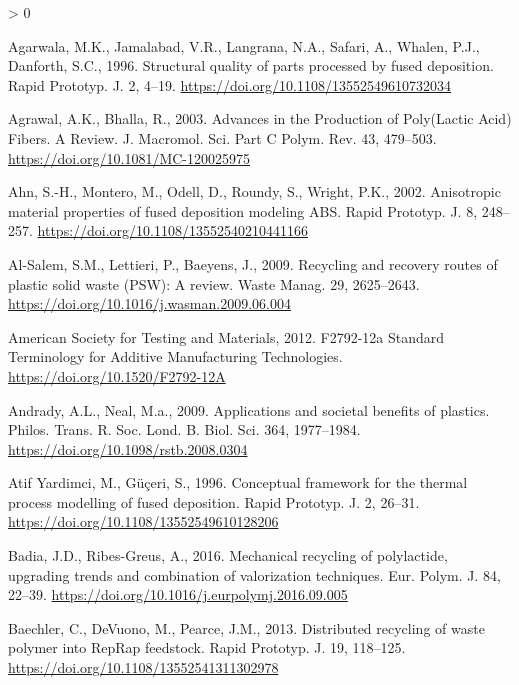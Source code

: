 \documentclass[
]{article}
\newlength{\cslhangindent}
\newenvironment{CSLReferences}[2] %
 {%
  \setlength{\parindent}{0pt}
  \ifodd #1 \everypar{\setlength{\hangindent}{\cslhangindent}}\ignorespaces\fi
  \ifnum #2 > 0
  \setlength{\parskip}{#2\baselineskip}
  \fi
 }%
 {}
\begin{document}
\hypertarget{refs}{}
\begin{CSLReferences}{1}{0}
\leavevmode\hypertarget{ref-Agarwala1996}{}%
Agarwala, M.K., Jamalabad, V.R., Langrana, N.A., Safari, A., Whalen,
P.J., Danforth, S.C., 1996. {Structural quality of parts processed by
fused deposition}. Rapid Prototyp. J. 2, 4--19.
\url{https://doi.org/10.1108/13552549610732034}

\leavevmode\hypertarget{ref-Agrawal2003}{}%
Agrawal, A.K., Bhalla, R., 2003. {Advances in the Production of
Poly(Lactic Acid) Fibers. A Review}. J. Macromol. Sci. Part C Polym.
Rev. 43, 479--503. \url{https://doi.org/10.1081/MC-120025975}

\leavevmode\hypertarget{ref-Ahn2002}{}%
Ahn, S.-H., Montero, M., Odell, D., Roundy, S., Wright, P.K., 2002.
{Anisotropic material properties of fused deposition modeling ABS}.
Rapid Prototyp. J. 8, 248--257.
\url{https://doi.org/10.1108/13552540210441166}

\leavevmode\hypertarget{ref-AlSalem2009}{}%
Al-Salem, S.M., Lettieri, P., Baeyens, J., 2009. {Recycling and recovery
routes of plastic solid waste (PSW): A review}. Waste Manag. 29,
2625--2643. \url{https://doi.org/10.1016/j.wasman.2009.06.004}

\leavevmode\hypertarget{ref-ASTM2012}{}%
American Society for Testing and Materials, 2012. {F2792-12a Standard
Terminology for Additive Manufacturing Technologies}.
\url{https://doi.org/10.1520/F2792-12A}

\leavevmode\hypertarget{ref-Andrady2009}{}%
Andrady, A.L., Neal, M.a., 2009. {Applications and societal benefits of
plastics.} Philos. Trans. R. Soc. Lond. B. Biol. Sci. 364, 1977--1984.
\url{https://doi.org/10.1098/rstb.2008.0304}

\leavevmode\hypertarget{ref-AtifYardimci1996}{}%
Atif Yardimci, M., Güçeri, S., 1996. {Conceptual framework for the
thermal process modelling of fused deposition}. Rapid Prototyp. J. 2,
26--31. \url{https://doi.org/10.1108/13552549610128206}

\leavevmode\hypertarget{ref-Badia2016}{}%
Badia, J.D., Ribes-Greus, A., 2016. {Mechanical recycling of
polylactide, upgrading trends and combination of valorization
techniques}. Eur. Polym. J. 84, 22--39.
\url{https://doi.org/10.1016/j.eurpolymj.2016.09.005}

\leavevmode\hypertarget{ref-Baechler2013}{}%
Baechler, C., DeVuono, M., Pearce, J.M., 2013. {Distributed recycling of
waste polymer into RepRap feedstock}. Rapid Prototyp. J. 19, 118--125.
\url{https://doi.org/10.1108/13552541311302978}


\end{CSLReferences}
\end{document}
